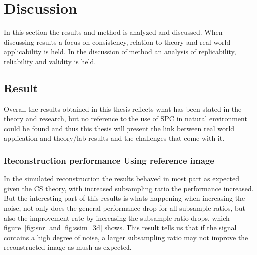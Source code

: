 \section{Discussion} %
In this section the results and method is analyzed and discussed. When discussing results a focus on consistency, relation to theory and real world applicability is held. In the discussion of method an analysis of replicability, reliability and  validity is held.

\subsection{Result} 
Overall the results obtained in this thesis reflects what has been stated in the theory and research, but no reference to the use of SPC in natural environment could be found and thus this thesis will present the link between real world application and theory/lab results and the challenges that come with it. 



\subsubsection{Reconstruction performance Using reference image}
\label{sec:anlys_ref_im}
In the simulated reconstruction the results behaved in most part as expected given the CS theory, with increased subsampling ratio the performance increased. But the interesting part of this results is whats happening when increasing the noise, not only does the general performance drop for all subsample ratios, but also the improvement rate by increasing the subsample ratio drops, which figure~\ref{fig:snr} and \ref{fig:ssim_3d} shows. This result tells us that if the signal contains a high degree of noise, a larger subsampling ratio may not improve the reconstructed image as mush as expected.\\[0.1in]


